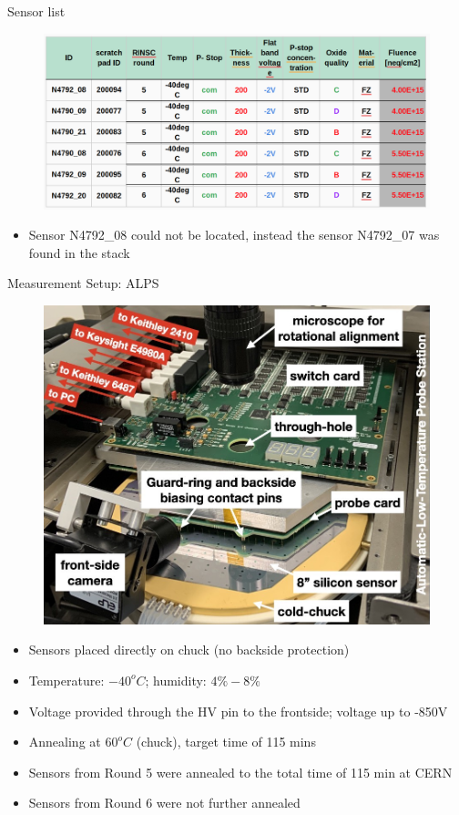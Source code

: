 \documentclass{beamer}
\begin{document}
\begin{frame}{Sensor list}
  \begin{figure}
      \includegraphics[width=.45\textwidth]{plots/Sensors.png}
  \end{figure}

  \begin{itemize}
      \small
      \item Sensor N4792\_08 could not be located, instead the sensor N4792\_07 was found in the stack
  \end{itemize}
\end{frame}


\begin{frame}{Measurement Setup: ALPS}
    \begin{figure}
        \includegraphics[width=.45\textwidth]{plots/ALPS_setup.png}
    \end{figure}
  
    \begin{itemize}
        \scriptsize
        \item Sensors placed directly on chuck (no backside protection)
        \item Temperature: $-40^oC$; humidity: $ 4\% - 8\%$
        \item Voltage provided through the HV pin to the frontside;  voltage up to \alert{-850V}
        \item Annealing at $60^oC$ (chuck), target time of 115 mins
        \item Sensors from Round 5 were annealed to the total time of 115 min at CERN 
        \item Sensors from Round 6 were not further annealed
    \end{itemize}
\end{frame}
  
\end{document}
